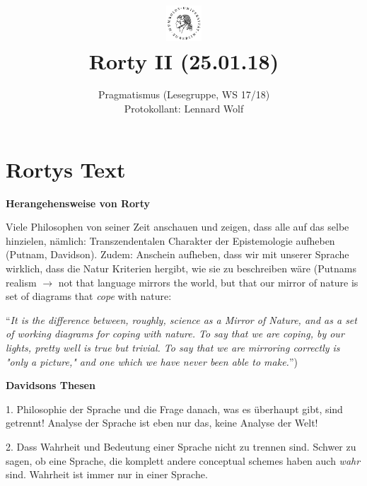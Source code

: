 \documentclass[a4paper, emulatestandardclasses]{scrartcl}
\date{\vspace{-3ex}}
\begin{document}
\title{
    \vspace{-30pt}
	\includegraphics*[width=0.1\textwidth,right]{ErstesSem/images/hu_logo2.png}\\
	\vspace{-10pt}
	Rorty II (25.01.18)}%
	\subtitle{Pragmatismus (Lesegruppe, WS 17/18)\\
          Protokollant: Lennard Wolf}
\maketitle
\vspace{-40pt}

\section*{Rortys Text}

\textbf{Herangehensweise von Rorty} 

Viele Philosophen von seiner Zeit anschauen und zeigen, dass alle auf das selbe hinzielen, nämlich: Transzendentalen Charakter der Epistemologie aufheben (Putnam, Davidson). Zudem: Anschein aufheben, dass wir mit unserer Sprache wirklich, dass die Natur Kriterien hergibt, wie sie zu beschreiben wäre (Putnams realism $\rightarrow$ not that language mirrors the world, but that our mirror of nature is set of diagrams that \emph{cope} with nature:

 "`\emph{It is the difference between, roughly, science as a Mirror of Nature, and as a set of working diagrams for coping with nature. To say that we are coping, by our lights, pretty well is true but trivial. To say that we are mirroring correctly is "only a picture," and one which we have never been able to make.}"')\newline

\noindent\textbf{Davidsons Thesen}

1. Philosophie der Sprache und die Frage danach, was es überhaupt gibt, sind getrennt! Analyse der Sprache ist eben nur das, keine Analyse der Welt! 

2. Dass Wahrheit und Bedeutung einer Sprache nicht zu trennen sind. Schwer zu sagen, ob eine Sprache, die komplett andere conceptual schemes haben auch \emph{wahr} sind. Wahrheit ist immer nur in einer Sprache.
\end{document}
